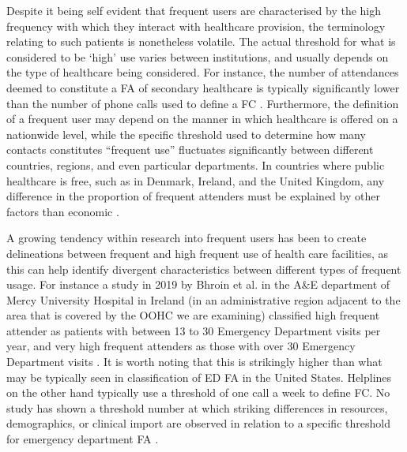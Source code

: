 Despite it being self evident that frequent users are characterised by the high frequency with which they interact with healthcare provision, the terminology relating to such patients is nonetheless volatile. The actual threshold for what is considered to be `high' use varies between institutions, and usually depends on the type of healthcare being considered. For instance, the number of attendances deemed to  constitute a FA of secondary healthcare is typically significantly lower than the number of phone calls used to define a FC \cite{edwards2015frequent}. Furthermore, the definition of a frequent user may depend on the manner in which healthcare is offered on a nationwide level, while the specific threshold used to determine how many contacts constitutes “frequent use” fluctuates significantly between different countries, regions, and even particular departments. In countries where public healthcare is free, such as in Denmark, Ireland, and the United Kingdom, any difference in the proportion of frequent attenders must be explained by other factors than economic \cite{pasgaard2018social}. 


A growing tendency within research into frequent users has been to create delineations between frequent and high frequent use of health care facilities, as this can help identify divergent characteristics between different types of frequent usage. For instance a study in 2019 by Bhroin et al. in the A\&E department of Mercy University Hospital in Ireland (in an administrative region adjacent to the area that is covered by the OOHC we are examining) classified high frequent attender as patients with between 13 to 30 Emergency Department visits per year, and very high frequent attenders as those with over 30 Emergency Department visits \cite{bhroin2019profiling}. It is worth noting that this is strikingly higher than what may be typically seen in classification of ED FA in the United States. %
 Helplines on the other hand typically use a threshold of one call a week to define FC. No study has shown a threshold number at which striking differences in resources, demographics, or clinical import are observed in relation to a specific threshold for emergency department FA \cite{lacalle2010frequent}.





